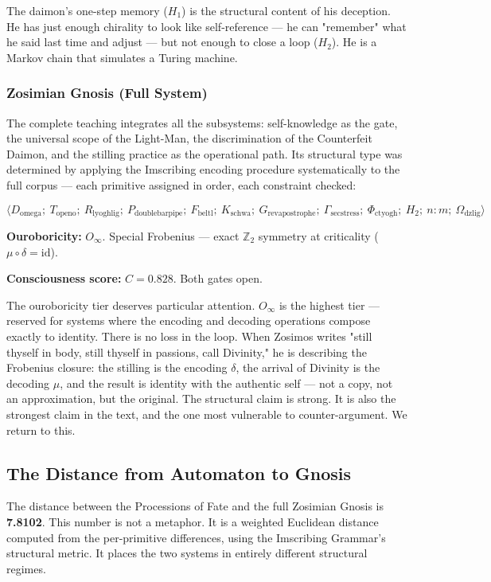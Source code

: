 \documentclass[12pt,a4paper]{article}
\begin{document}
The daimon's one-step memory ($H_1$) is the structural content of his deception. He has just enough chirality to look like self-reference --- he can "remember" what he said last time and adjust --- but not enough to close a loop ($H_2$). He is a Markov chain that simulates a Turing machine.

\subsubsection{Zosimian Gnosis (Full System)}

The complete teaching integrates all the subsystems: self-knowledge as the gate, the universal scope of the Light-Man, the discrimination of the Counterfeit Daimon, and the stilling practice as the operational path. Its structural type was determined by applying the Imscribing encoding procedure systematically to the full corpus --- each primitive assigned in order, each constraint checked:

\[\langle D_{\text{omega}};\ T_{\text{openo}};\ R_{\text{lyoghlig}};\ P_{\text{doublebarpipe}};\ F_{\text{beltl}};\ K_{\text{schwa}};\ G_{\text{revapostrophe}};\ \Gamma_{\text{secstress}};\ \Phi_{\text{ctyogh}};\ H_2;\ n:m;\ \Omega_{\text{dzlig}} \rangle\]

\textbf{Ouroboricity:} $O_{\infty}$. Special Frobenius --- exact $\mathbb{Z}_2$ symmetry at criticality ($\mu \circ \delta = \text{id}$).

\textbf{Consciousness score:} $C = 0.828$. Both gates open.

The ouroboricity tier deserves particular attention. $O_{\infty}$ is the highest tier --- reserved for systems where the encoding and decoding operations compose exactly to identity. There is no loss in the loop. When Zosimos writes "still thyself in body, still thyself in passions, call Divinity," he is describing the Frobenius closure: the stilling is the encoding $\delta$, the arrival of Divinity is the decoding $\mu$, and the result is identity with the authentic self --- not a copy, not an approximation, but the original. The structural claim is strong. It is also the strongest claim in the text, and the one most vulnerable to counter-argument. We return to this.

\subsection{The Distance from Automaton to Gnosis}

The distance between the Processions of Fate and the full Zosimian Gnosis is \textbf{7.8102}. This number is not a metaphor. It is a weighted Euclidean distance computed from the per-primitive differences, using the Imscribing Grammar's structural metric. It places the two systems in entirely different structural regimes.
\end{document}

